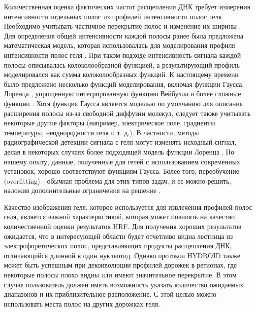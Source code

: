     Количественная оценка фактических частот расщепления ДНК требует измерения интенсивности отдельных полос из профилей интенсивности полос геля. Необходимо учитывать частичное перекрытие полос и изменение их ширины \cite{brahmasandra_mobility_2001}. Для определения общей интенсивности каждой полосы ранее была предложена математическая модель, которая использовалась для моделирования профиля интенсивности полос геля \cite{shadle_quantitative_1997}. При таком подходе интенсивность сигнала каждой полосы описывалась колоколообразной функцией, а результирующий профиль моделировался как сумма колоколообразных функций. К настоящему времени было предложено несколько функций моделирования, включая функции Гаусса, Лоренца \cite{shadle_quantitative_1997}, упрощенную интегрированную функцию Вейбулла \cite{bamidis_improved_2010} и более сложные функции \cite{greenbaum_construction_2007}. Хотя функция Гаусса является моделью по умолчанию для описания расширения полосы из-за свободной диффузии молекул, следует также учитывать некоторые другие факторы (например, электрическое поле, градиенты температуры, неоднородности геля и т. д.). В частности, методы радиографической детекции сигнала с геля могут изменять исходный сигнал, делая в некоторых случаях более подходящей модель функции Лоренца \cite{berg_appendix_1997}. По нашему опыту, данные, полученные для гелей с использованием современных установок, хорошо соответствуют функциям Гаусса. Более того, переобучение (overfitting) - обычная проблема для этих типов задач, и ее можно решить, наложив дополнительные ограничения на решение \cite{takamoto_semi-automated_2004}.
    
    Качество изображения геля, которое используется для извлечения профилей полос геля, является важной характеристикой, которая может повлиять на качество количественной оценки результатов HRF. Для получения хороших результатов ожидается, что в интересующей области будет отчетливо видна лестница из электрофоретических полос, представляющих продукты расщепления ДНК, отличающийся длинной в один нуклеотид. Однако протокол HYDROID также может быть успешным при деконволюции профилей дорожек в регионах, где некоторые полосы плохо видны или имеют значительное перекрытие. В этом случае пользователь должен иметь возможность указать количество ожидаемых диапазонов и их приблизительное расположение. С этой целью можно использовать места полос на других дорожках геля.
    

